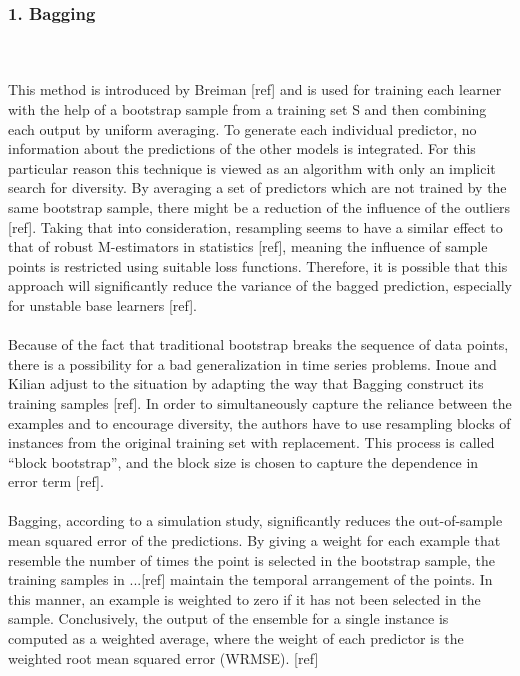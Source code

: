 \documentclass[runningheads,a4paper]{llncs}[2015/06/24]
\begin{document}
\subsubsection{1. Bagging}
\hspace{1cm}\\\\This method is introduced by Breiman [ref] and is used for training each learner with the help of a bootstrap sample from a training set S and then combining each output by uniform averaging. To generate each individual predictor, no information about the predictions of the other models is integrated. For this particular reason this technique is viewed as an algorithm with only an implicit search for diversity. By averaging a set of predictors which are not trained by the same bootstrap sample, there might be a reduction of the influence of the outliers [ref]. Taking that into consideration, resampling seems to have a similar effect to that of robust M-estimators in statistics [ref],  meaning the influence of sample points is restricted using suitable loss functions. Therefore, it is possible that this approach will significantly reduce the variance of the bagged prediction, especially for unstable base learners [ref]. \\\\Because of the fact that traditional bootstrap breaks the sequence of data points, there is a possibility for a bad generalization in time series problems. Inoue and Kilian adjust to the situation by adapting the way that Bagging construct its training samples [ref]. In order to simultaneously capture the reliance between the examples and to encourage diversity,  the authors have to use resampling blocks of instances from the original training set with replacement. This process is called \enquote{block bootstrap}, and the block size is chosen to capture the dependence in error term [ref].
\\\\Bagging, according to a simulation study,  significantly reduces the out-of-sample mean squared error of the predictions. By giving a weight for each example that resemble the number of times the point is selected in the bootstrap sample, the training samples in ...[ref] maintain the temporal arrangement of the points. In this manner, an example is weighted to zero if it has not been selected in the sample. Conclusively, the output of the ensemble for a single instance is computed as a weighted average, where the weight of each predictor is the weighted root mean squared error (WRMSE). [ref]
\end{document}
